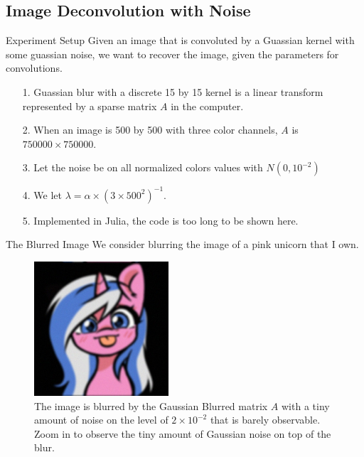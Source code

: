 \documentclass[11pt]{beamer}
\begin{document}
    \subsection{Image Deconvolution with Noise}
        \begin{frame}{Experiment Setup}
            Given an image that is convoluted by a Guassian kernel with some guassian noise, we want to recover the image, given the parameters for convolutions. 
            \begin{itemize}
                \item [1.] Guassian blur with a discrete 15 by 15 kernel is a linear transform represented by a sparse matrix $A$ in the computer. 
                \item [2.] When an image is 500 by 500 with three color channels, $A$ is $750000 \times 750000$. 
                \item [3.] Let the noise be on all normalized colors values with $N(0, 10^{-2})$
                \item [4.] We let $\lambda = \alpha\times (3\times500^2)^{-1}$. 
                \item [5.] Implemented in Julia, the code is too long to be shown here. 
            \end{itemize}        
        \end{frame}
        \begin{frame}{The Blurred Image}
            We consider blurring the image of a pink unicorn that I own. 
            \begin{figure}[H]
                \centering
                \includegraphics[width=5cm]{blurred_img.jpg}
                \caption{The image is blurred by the Gaussian Blurred matrix $A$ with a tiny amount of noise on the level of $2\times 10^{-2}$ that is barely observable. Zoom in to observe the tiny amount of Gaussian noise on top of the blur.}
                \label{fig:blurred_alto}
            \end{figure}
        \end{frame}
\end{document}
